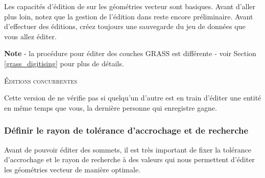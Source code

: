 Les capacités d'édition de \qg sur les géométries vecteur sont basiques. Avant d'aller plus loin, notez que la gestion de l'édition dans \qg reste encore préliminaire. Avant d'effectuer des éditions, créez toujours une sauvegarde du jeu de données que vous allez éditer.

\textbf{Note} - la procédure pour éditer des couches GRASS est différente - voir Section \ref{grass_digitising} pour plus de détails.


\begin{Tip}[ht]\caption{\textsc{Éditions concurrentes}}
Cette version de \qg ne vérifie pas si quelqu'un d'autre est en train d'éditer une entité en même temps que vous, la dernière personne qui enregistre gagne.
\end{Tip}

\subsubsection{Définir le rayon de tolérance d'accrochage et de recherche}\label{snapping_tolerance}

Avant de pouvoir éditer des sommets, il est très important de fixer la tolérance d'accrochage et le rayon de recherche à des valeurs qui nous permettent d'éditer les géométries vecteur de manière optimale.


